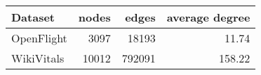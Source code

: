 \begin{tabular}{lrrr}
\toprule
Dataset &  nodes &  edges &  average degree \\
\midrule
OpenFlight  &  3097 &     18193 &   11.74 \\
WikiVitals  &  10012 &    792091 &  158.22 \\
\bottomrule
\end{tabular}


